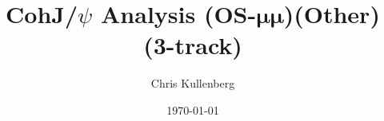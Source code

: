 \title{CohJ/$\psi$ Analysis (\textbf{OS}-$\boldsymbol{\mu\mu}$)(\textbf{Other})(\textbf{3-track})}
\author{Chris Kullenberg}
\date{\today}
